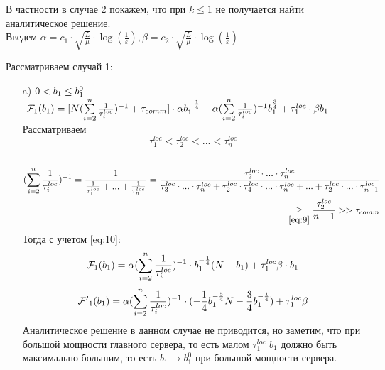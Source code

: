 \documentclass{article}
\begin{document}
В частности в случае 2 покажем, что при $k \leq 1$ не получается найти аналитическое решение.\\ Введем $\alpha = c_1\cdot\sqrt{\frac{L}{\mu}}\cdot \log(\frac{1}{\varepsilon}),\beta = c_2\cdot\sqrt{\frac{L}{\mu}}\cdot \log(\frac{1}{\varepsilon}) $

Рассматриваем случай 1:
\begin{itemize}
    \item [a)] $0 < b_1 \leq b_1^0\\$
    $~\mathcal{F}_1(b_1) = [N (\sum\limits_{i = 2}^{n} \frac{1}{\tau_i^{loc}})^{-1} + \tau_{comm}]\cdot 
    \alpha  b_1^{-\frac{1}{4}} - 
    \alpha(\sum\limits_{i =
    2}^{n} \frac{1}{\tau_i^{loc}})^{-1} b_1^{\frac{3}{4}}  + \tau_1^{loc}\cdot\beta b_1\\$
    Рассматриваем
    \begin{equation}
        \label{eq:9}
        \tau_1^{loc} < \tau_2^{loc} < ... < \tau_n^{loc}
    \end{equation}\\
    \begin{eqnarray}
        \label{eq:10}
        \begin{split}
            (\sum\limits_{i = 2}^n \frac{1}{\tau_i^{loc}})^{-1} = \frac{1}{\frac{1}{\tau_1^{loc}} + ... + \frac{1}{\tau_n^{loc}} } = \frac{\tau_2^{loc}\cdot ... \cdot\tau_n^{loc}}{\tau_3^{loc}\cdot ... \cdot\tau_n^{loc} + \tau_2^{loc}\cdot \tau_4^{loc}\cdot... \cdot\tau_n^{loc} + ... + \tau_2^{loc}\cdot ... \cdot\tau_{n-1}^{loc}}\\ \underset{\ref{eq:9}}{\geq}\frac{\tau_2^{loc}}{n - 1} >> \tau_{comm}
        \end{split}
    \end{eqnarray}
    Тогда с учетом \ref{eq:10}:
    \begin{eqnarray}
        \notag
        \begin{split}
            \mathcal{F}_1(b_1) = \alpha(\sum\limits_{i = 2}^n \frac{1}{\tau_i^{loc}})^{-1}\cdot b_1^{-\frac{1}{4}}(N - b_1) + \tau_1^{loc}\beta\cdot b_1
        \end{split}
    \end{eqnarray}
    \begin{equation}
    \notag
        \mathcal{F'}_1 (b_1) = \alpha(\sum\limits_{i = 2}^n \frac{1}{\tau_i^{loc}})^{-1}\cdot (-\frac{1}{4}b_1^{-\frac{5}{4}}N - \frac{3}{4}b_1^{-\frac{1}{4}}) + \tau_1^{loc}\beta
    \end{equation}
    Аналитическое решение в данном случае не приводится, но заметим, что при большой мощности главного сервера, то есть малом $\tau_1^{loc}$ $b_1$ должно быть максимально большим, то есть $b_1\rightarrow b_1^0$ при большой мощности сервера. 


\end{itemize}
\end{document}
